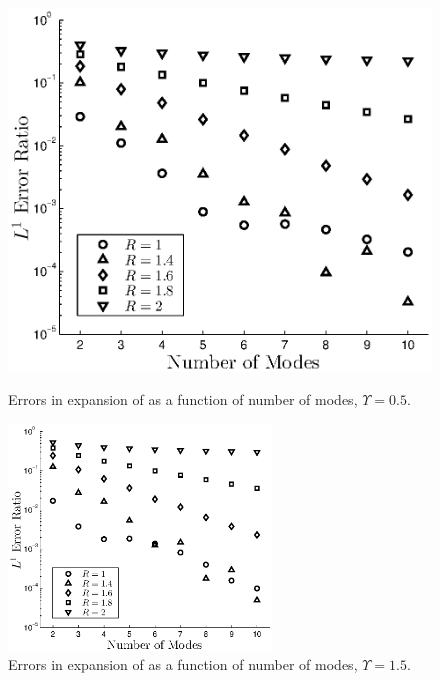 \begin{figure}[H]
 \begin{minipage}[b]{0.5\linewidth}
\centerline{\includegraphics[height=6.cm]{03-birrell/SpectralMethodBoltzmann/free_stream_f0_approx_Ups_5.eps}}
\caption{Errors in expansion of  as a function of number of modes, $\Upsilon=0.5$.}\label{fig:free_stream_f0_approx_Ups_5}
 \end{minipage}
 \hspace{0.5cm}
 \begin{minipage}[b]{0.5\linewidth}
\centerline{\includegraphics[height=6cm]{03-birrell/SpectralMethodBoltzmann/free_stream_f0_approx_Ups_1_5.eps}}
\caption{Errors in  expansion of  as a function of number of modes, $\Upsilon=1.5$.}\label{fig:free_stream_f0_approx_Ups_1_5}
 \end{minipage}
 \end{figure}



